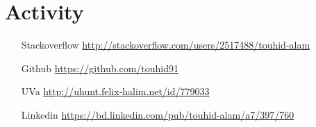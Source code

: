 \section{Activity}

\begin{itemize}
  \item[Stackoverflow] \url{http://stackoverflow.com/users/2517488/touhid-alam}
  \item[Github] \url{https://github.com/touhid91}
  \item[UVa] \url{http://uhunt.felix-halim.net/id/779033}
  \item[Linkedin] \url{https://bd.linkedin.com/pub/touhid-alam/a7/397/760}
\end{itemize}
